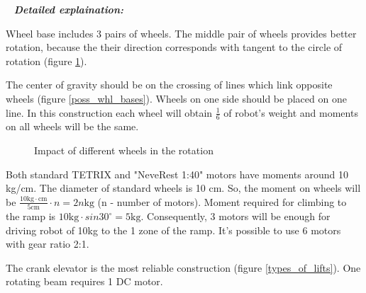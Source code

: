    \newline
  \textit{\textbf{Detailed explaination:}}
  \begin{enumerate*}
  	\item Wheel base includes 3 pairs of wheels. The middle pair of wheels provides better rotation, because the their direction corresponds with tangent to the circle of rotation (figure \ref{cntr_whls}). \label{chassis}
  	
  	The center of gravity should be on the crossing of lines which link opposite wheels (figure \ref{poss_whl_bases}). Wheels on one side should be placed on one line. In this construction each wheel will obtain $\frac{1}{6}$ of robot's weight and moments on all wheels will be the same. 
  	\begin{figure}[H]
  		\begin{minipage}[h]{1\linewidth}
  		  \caption{Impact of different wheels in the rotation}
  		  \label{cntr_whls}
  		\end{minipage}
  	\end{figure}
  	
  	\item Both standard TETRIX and "NeveRest 1:40" motors have moments around 10 kg/cm. The diameter of standard wheels is 10 cm. So, the moment on wheels will be $\frac{10\text{kg} \cdot \text{cm}}{5\text{cm}} \cdot n = 2n\text{kg}$ (n - number of motors). Moment required for climbing to the ramp is $10\text{kg} \cdot sin30^\circ = 5\text{kg}$. Consequently, 3 motors will be enough for driving robot of 10kg to the 1 zone of the ramp. It's possible to use 6 motors with gear ratio 2:1.
  	\item The crank elevator is the most reliable construction (figure \ref{types_of_lifts}). One rotating beam requires 1 DC motor.
  	

\end{enumerate*}
